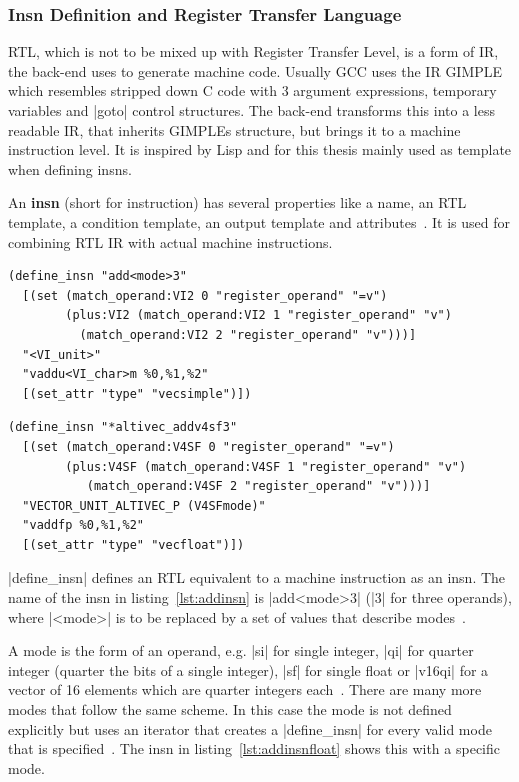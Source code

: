 {\subsubsection{Insn Definition and Register Transfer Language}
\label{sec:defineinsn}
\acf{RTL}, which is not to be mixed up with Register Transfer Level, is a form of \ac{IR}, the back-end uses to generate machine code.
Usually \ac{GCC} uses the \ac{IR} GIMPLE which resembles stripped down C code with 3 argument expressions, temporary variables and |goto| control structures.
The back-end transforms this into a less readable \ac{IR}, that inherits GIMPLEs structure, but brings it to a machine instruction level.
It is inspired by Lisp and for this thesis mainly used as template when defining insns.

An \textbf{insn} (short for instruction) has several properties like a name, an \ac{RTL} template, a condition template, an output template and attributes~\cite[ch.~16.2]{GCCint}.
It is used for combining \ac{RTL} \ac{IR} with actual machine instructions.

\begin{lstlisting}[caption=Definition of a General {\tt add} Insn, label=lst:addinsn, float, floatplacement=htbp]
(define_insn "add<mode>3"
  [(set (match_operand:VI2 0 "register_operand" "=v")
        (plus:VI2 (match_operand:VI2 1 "register_operand" "v")
		  (match_operand:VI2 2 "register_operand" "v")))]
  "<VI_unit>"
  "vaddu<VI_char>m %0,%1,%2"
  [(set_attr "type" "vecsimple")])
\end{lstlisting}
\begin{lstlisting}[caption=Definition of {\tt add} Insn for {\tt float}, label=lst:addinsnfloat, float, floatplacement=htbp]
(define_insn "*altivec_addv4sf3"
  [(set (match_operand:V4SF 0 "register_operand" "=v")
        (plus:V4SF (match_operand:V4SF 1 "register_operand" "v")
		   (match_operand:V4SF 2 "register_operand" "v")))]
  "VECTOR_UNIT_ALTIVEC_P (V4SFmode)"
  "vaddfp %0,%1,%2"
  [(set_attr "type" "vecfloat")])
\end{lstlisting}

|define_insn| defines an \ac{RTL} equivalent to a machine instruction as an insn.
The name of the insn in listing~\ref{lst:addinsn} is |add<mode>3| (|3| for three operands), where |<mode>| is to be replaced by a set of values that describe modes~\cite[ch.~16.9]{GCCint}.

A mode is the form of an operand, e.g. |si| for single integer, |qi| for quarter integer (quarter the bits of a single integer), |sf| for single float or |v16qi| for a vector of 16 elements which are quarter integers each~\cite[ch.~13.6]{GCCint}.
There are many more modes that follow the same scheme.
In this case the mode is not defined explicitly but uses an iterator that creates a |define_insn| for every valid mode that is specified~\cite[ch.~16.23]{GCCint}.
The insn in listing~\ref{lst:addinsnfloat} shows this with a specific mode.

}
